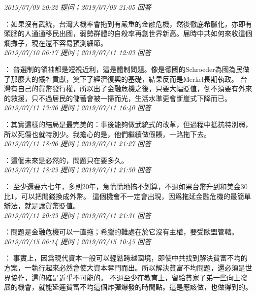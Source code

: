 \documentclass[twocolumn]{ctexart}
\begin{document}
\textit{\hfill\noindent\small 2019/07/09 20:22 提问；2019/07/09 21:05 回答}

：如果沒有武統，台灣大機率會拖到有嚴重的金融危機，然後徹底希臘化，亦即有頭腦的人通通移民出國，弱勢群體的自殺率再創世界新高。届時中共如何來收這個爛攤子，現在還不容易預測細節。
\\

\textit{\hfill\noindent\small 2019/07/10 06:17 提问；2019/07/11 12:03 回答}

：
普選制的領袖都是短視近利，這是體制問題。像是德國的Schroeder為國為民做了那麼大的犧牲貢獻，奠下了經濟復興的基礎，結果反而是Merkel長期執政。 
台灣有自己的貨幣發行權，所以出了金融危機之後，只要大幅貶值，倒不須要有外來的救援，只不過居民的儲蓄會被一掃而光，生活水準更會斷崖式下降而已。
\\

\textit{\hfill\noindent\small 2019/07/11 13:36 提问；2019/07/11 16:40 回答}

：其實這樣的結局是最完美的：事後能夠做武統式的改革，但過程中抵抗特別弱，所以死傷也就特別少。我擔心的是，他們繼續做假賬，一路拖下去。
\\

\textit{\hfill\noindent\small 2019/07/11 18:06 提问；2019/07/11 21:27 回答}

：這個未來是必然的，問題只在要多久。
\\

\textit{\hfill\noindent\small 2019/07/11 18:23 提问；2019/07/11 21:50 回答}

：
至少還要六七年，多則20年，急慌慌地搞不划算，不過如果台幣升到和美金30比1，可以把閒錢換成外幣。
這個機會不一定會出現，因爲拖延金融危機的最簡單辦法，就是讓貨幣貶值。
\\

\textit{\hfill\noindent\small 2019/07/11 20:33 提问；2019/07/11 21:31 回答}

：問題是金融危機可以一直拖；希臘的難處在於它沒有主權，要受歐盟管轄。
\\

\textit{\hfill\noindent\small 2019/07/15 06:14 提问；2019/07/15 10:45 回答}

：
事實上，因爲現代資本一般可以輕鬆跨越國境，即使中共找到解決貧富不均的方案，一執行起來必然會使大資本奪門而出。所以解決貧富不均問題，還必須是世界協作，這的確是近乎不可能的。
不過至少在教育上，留給貧家子弟一些向上發展的機會，就能延遲貧富不均這個炸彈爆發的時間點。這是應該做，也做得到的。
\\
\end{document}
